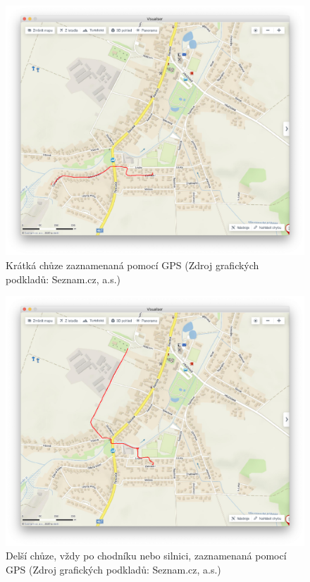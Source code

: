 \documentclass[czech, bachelor]{diploma}
\begin{document}
\begin{figure}
    \centering
    \includegraphics[width=1\textwidth]{Figures/domzolsiny.png}
    \caption{Krátká chůze zaznamenaná pomocí GPS (Zdroj grafických podkladů: Seznam.cz, a.s.)}
    \label{fig:domzolsiny-fullsize}
\end{figure}

\begin{figure}
    \centering
    \includegraphics[width=1\textwidth]{Figures/hrbitov.png}
    \caption{Delší chůze, vždy po chodníku nebo silnici, zaznamenaná pomocí GPS (Zdroj grafických podkladů: Seznam.cz, a.s.)}
    \label{fig:hrbitov-fullsize}
\end{figure}
\end{document}
